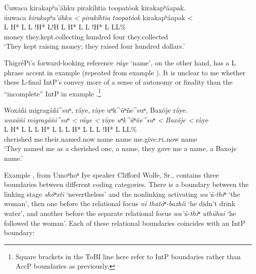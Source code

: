 \documentclass[output=paper]{LSP/langsci}
\begin{document}
\newpage
\ea\label{waterbusterincomplete}
 	Úuwaca kirakapʰa’áhku pirakíhtia toopatóok kirakapʰáapak.\footnotemark\\
\glll	úuwaca	\emph{kirakapʰa’áhku <}		\emph{pirakíhtia}	\emph{toopatóok}	{kirakapʰáapak <}\\
	{\ob L H* L}	{L !H* L!H\cb}	{\ob L H* L}		{}			{L !H* L L\cb{}L\%}\\
	money	they.kept.collecting			hundred		four			they.collected\\
\glt	`They kept raising money; they raised four hundred dollars.'
\z

ThigréPi’s forward-looking reference \emph{ráye} `name', on the other hand, has a L phrase accent in example  (repeated from example ). It is unclear to me whether these L-final IntP’s convey more of a sense of autonomy or finality than the “incomplete” IntP in example .\footnote{Square brackets in the ToBI line here refer to IntP boundaries rather than AccP boundaries as previously.}

\ea\label{thigrepirayerept}
Woxáñi migragáñi\^{}suⁿ, ráye, ráye uⁿk\^{}úⁿñe\^{}suⁿ, Baxóje ráye.\footnotemark\\
\glll	\emph{woxáñi} 	\emph{migragáñi\^{}suⁿ <}		\emph{ráye <}	ráye		\emph{uⁿk\^{}úⁿñe\^{}suⁿ <}	\emph{Baxóje <}		ráye\\
	{\ob L H* L}		{L\cb}	{\ob L H* L L\cb}	{\ob L H* L}	{L\cb}	{\ob L !H* L} 		{L\cb{}L\%}\\
	cherished		me.their.named.now			name			name		me.give.\textsc{pl}.now						name\\
\glt	`They named me as a cherished one, a name, they gave me a name, a Baxoje name.'
\z

Example , from Umoⁿhoⁿ Iye speaker Clifford Wolfe, Sr., contains three boundaries between different coding categories. There is a boundary between the linking stage  \emph{shóⁿxti} `nevertheless' and the nonlinking activating  \emph{wa’ú-thiⁿ} `the woman', then one before the relational focus \emph{ní thatóⁿ-bazhíi} `he didn’t drink water', and another before the separate relational focus \emph{wa’ú-thiⁿ uthúhai} `he followed the woman'. Each of these relational boundaries coincides with an IntP boundary:
\end{document}
